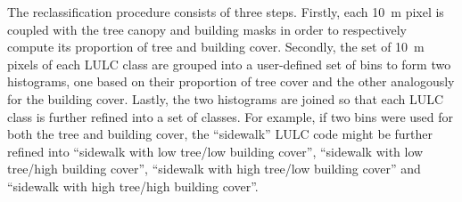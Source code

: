 \documentclass[10pt,letterpaper]{article}
\begin{document}
The reclassification procedure consists of three steps.
Firstly, each 10~m pixel is coupled with the tree canopy and building masks in order to respectively compute its proportion of tree and building cover.
Secondly, the set of 10~m pixels of each LULC class are grouped into a user-defined set of bins to form two histograms, one based on their proportion of tree cover and the other analogously for the building cover.
Lastly, the two histograms are joined so that each LULC class is further refined into a set of classes. For example, if two bins were used for both the tree and building cover, the ``sidewalk'' LULC code might be further refined into ``sidewalk with low tree/low building cover'', ``sidewalk with low tree/high building cover'', ``sidewalk with high tree/low building cover'' and ``sidewalk with high tree/high building cover''.
\end{document}
